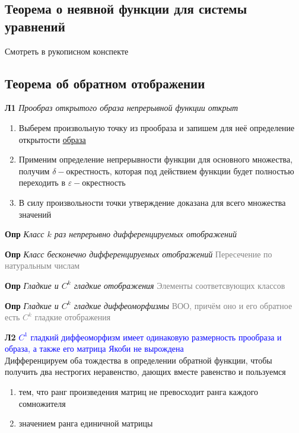 \subsection{Теорема о неявной функции для системы уравнений}

Смотреть в рукописном конспекте

\subsection{Теорема об обратном отображении}

\textbf{Л1} \textit{Прообраз открытого образа непрерывной функции открыт}

\begin{enumerate}
    \item Выберем произвольную точку из прообраза и запишем для неё определение открытости \underline{образа}
    \item Применим определение непрерывности функции для основного множества, получим $\delta-$окрестность,
    которая под действием функции будет полностью переходить в $\varepsilon-$окрестность
    \item В силу произвольности точки утверждение доказана для всего множества значений
\end{enumerate}

\textbf{Опр} \textit{Класс $k$ раз непрерывно дифференцируемых отображений}

\textbf{Опр} \textit{Класс бесконечно дифференцируемых отображений}
\textcolor{gray}{Пересечение по натуральным числам}

\textbf{Опр} \textit{Гладкие и $C^k$ гладкие отображения} \textcolor{gray}{Элементы соответсвующих классов}

\textbf{Опр} \textit{Гладкие и $C^k$ гладкие диффеоморфизмы}
\textcolor{gray}{ВОО, причём оно и его обратное есть $C^k$ гладкие отображения}

\textbf{Л2} \textcolor{blue}{$C^1$ гладкий диффеоморфизм имеет одинаковую размерность прообраза и образа, а также его
матрица Якоби не вырождена} \\

Дифференцируем оба тождества в определении обратной функции, чтобы получить два нестрогих неравенство, дающих
вместе равенство и пользуемся
\begin{enumerate}
    \item тем, что ранг произведения матриц не превосходит ранга каждого сомножителя
    \item значением ранга единичной матрицы
\end{enumerate}


